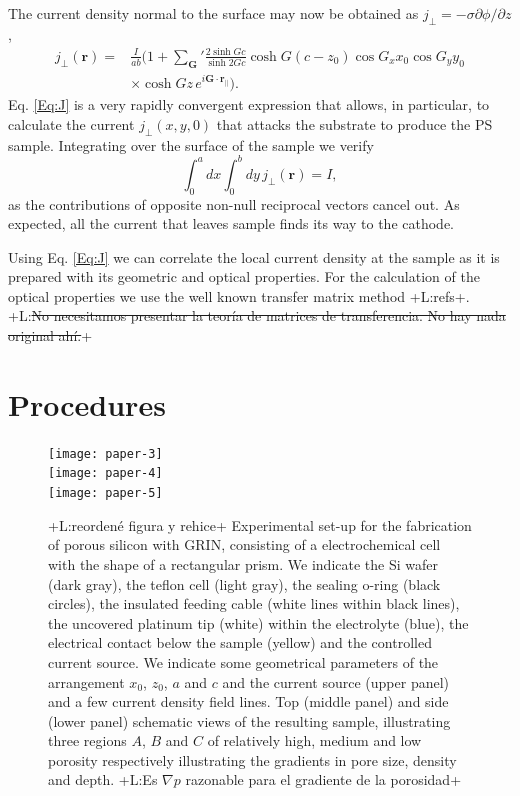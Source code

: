 \documentclass{article}
\newcommand{\notaL}[1]{{\color{blue}+L:#1+}}
\begin{document}
The current density normal to the surface may now be obtained as
$j_\perp=-\sigma\partial\phi/\partial z$,
\begin{equation}
  \label{Eq:J}
  \begin{split}
    j_\perp(\bm r) =& \frac{I}{ab}\biggl(1+{\sum_{\bm G}}'\frac{2\sinh
      Gc}{\sinh 2Gc}\cosh G(c-z_0)\cos G_x x_0 \cos G_y y_0\\
    &\times \cosh Gz\, e^{i\bm G\cdot\bm r_\|}\biggr).
  \end{split}
\end{equation}
Eq. \eqref{Eq:J} is a very rapidly convergent expression that allows,
in particular, to calculate the current $j_\perp(x,y,0)$ that attacks
the substrate to produce the PS sample.
Integrating over the surface of the sample we verify
\begin{equation}
  \label{eq:intj}
  \int_0^adx\int_0^bdy\,j_\perp(\bm r)=I,
\end{equation}
as the contributions of opposite non-null reciprocal vectors cancel
out. As expected, all the current that leaves sample finds
its way to the cathode.

Using Eq. \eqref{Eq:J} we can correlate the local current density at
the sample as it is prepared with its geometric and optical
properties. For the calculation of the optical properties we use the
well known transfer matrix method \notaL{refs}.
\notaL{\sout{No necesitamos presentar la teoría de matrices de
  transferencia. No hay nada original ahí.}}


\section{Procedures}
\label{sec:procedures}
\begin{figure}
  \centering
  \texttt{[image: paper-3]}\\[12pt]
  \texttt{[image: paper-4]}\\[12pt]
  \texttt{[image: paper-5]}

  \caption{\notaL{reordené figura y rehice} Experimental set-up for
    the fabrication of porous silicon with GRIN, consisting of a
    electrochemical cell with the shape of a
    rectangular prism. We indicate the Si wafer (dark
    gray), the teflon cell (light gray), the sealing o-ring (black
    circles), the insulated feeding cable (white lines within black
    lines), the uncovered platinum tip (white) within the
    electrolyte (blue), the electrical contact below the sample
    (yellow) and the controlled current source. We indicate some geometrical
    parameters of the arrangement $x_0$, $z_0$, $a$ and $c$
    and the current source (upper panel) and a few current density
    field lines. Top (middle panel) and
    side (lower panel) schematic views of the resulting sample,
    illustrating three regions $A$, $B$ and $C$ of relatively high, medium and
    low porosity respectively illustrating the gradients in pore
    size, density and depth. \notaL{Es $\nabla p$ razonable para el
      gradiente de la porosidad}}
  \label{fig:DE1}
\end{figure}
\end{document}
